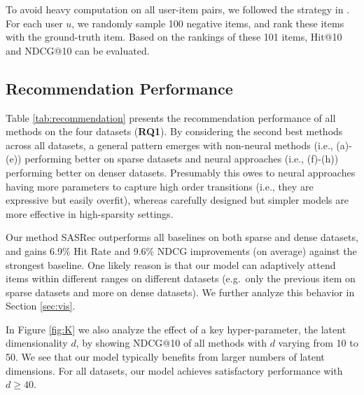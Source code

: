 \documentclass[conference]{IEEEtran}
\begin{document}
To avoid heavy computation on all user-item pairs, we followed the strategy in \cite{koren2008factorization,NeuMF}. For each user $u$, we randomly sample 100 negative items, and rank these items with the ground-truth item. Based on the rankings of these 101 items, Hit@10 and NDCG@10 can be evaluated.




\subsection{Recommendation Performance}

Table \ref{tab:recommendation} presents the recommendation performance of all methods on the four datasets (\textbf{RQ1}). By considering the second best methods across all datasets, a general pattern emerges with non-neural methods (i.e., (a)-(e)) performing better on sparse datasets and neural approaches (i.e., (f)-(h)) 
performing better on denser datasets.
Presumably 
this owes to
neural approaches having more parameters to capture high order transitions (i.e., they are expressive but easily overfit),
whereas carefully designed but simpler models are more effective in high-sparsity settings.


Our method SASRec outperforms all baselines on both sparse and dense datasets, and gains 6.9\% Hit Rate and 9.6\% NDCG improvements (on average) against the strongest baseline. One likely
reason is that our model can adaptively attend items within different ranges on different datasets (e.g.~only 
the previous
item on sparse datasets 
and more
on dense datasets). 
We further analyze this
behavior
in Section \ref{sec:vis}.

In Figure \ref{fig:K} we also
analyze the effect of 
a
key hyper-parameter, the latent dimensionality $d$, by showing NDCG@10 of all methods with $d$ varying from 10 to 50. We see that our model typically benefits from larger numbers of latent dimensions. For all datasets, our model achieves satisfactory performance with $d\geq40$.
\end{document}
